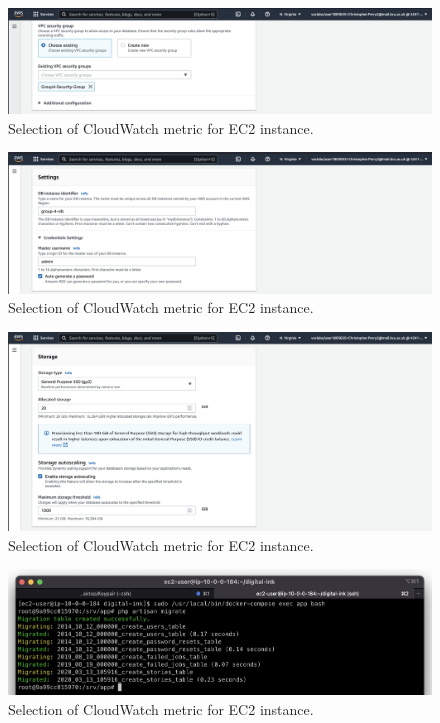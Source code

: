 \begin{figure}[!htbp]
    \centering
    \includegraphics[width=\textwidth]{resources/rds/rds-security-group.png}
    \caption{Selection of CloudWatch metric for EC2 instance.}
    \label{fig:rds-security}
\end{figure}

\begin{figure}[!htbp]
    \centering
    \includegraphics[width=\textwidth]{resources/rds/rds-settings.png}
    \caption{Selection of CloudWatch metric for EC2 instance.}
    \label{fig:rds-settings}
\end{figure}

\begin{figure}[!htbp]
    \centering
    \includegraphics[width=\textwidth]{resources/rds/rds-storage.png}
    \caption{Selection of CloudWatch metric for EC2 instance.}
    \label{fig:rds-storage}
\end{figure}

\begin{figure}[!htbp]
    \centering
    \includegraphics[width=\textwidth]{resources/rds/rds-tables-creation.png}
    \caption{Selection of CloudWatch metric for EC2 instance.}
    \label{fig:rds-tables}
\end{figure}


